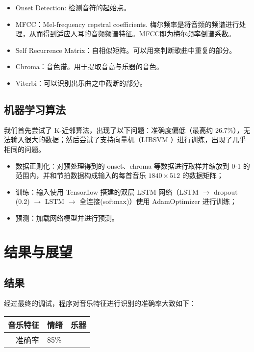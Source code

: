 \documentclass[a4paper,utf8,10pt]{article}
\newcommand{\sept}{\setlength\itemsep{-4pt}}
\begin{document}
\noindent\begin{itemize}
  \sept
  \item Onset Detection: 检测音符的起始点。
  \item MFCC：Mel-frequency cepstral coefficients. 梅尔频率是将音频的频谱进行处理，从而得到适应人耳的音频频谱特征。MFCC即为梅尔频率倒谱系数。
  \item Self Recurrence Matrix：自相似矩阵。可以用来判断歌曲中重复的部分。
  \item Chroma：音色谱。用于提取音高与乐器的音色。
  \item Viterbi：可以识别出乐曲之中截断的部分。
\end{itemize}

\subsection{机器学习算法}

我们首先尝试了 K-近邻算法，出现了以下问题：准确度偏低（最高约 26.7\%），无法输入很大的数据；然后尝试了支持向量机（LIBSVM \cite{CC01a}）进行训练，出现了几乎相同的问题。

\noindent\begin{itemize}
  \sept
  \item 数据正则化：对预处理得到的 onset、chroma 等数据进行取样并缩放到 0-1 的范围内，并和节拍数据构成输入的每首音乐 $1840\times 512$ 的数据矩阵；
  \item 训练：输入使用 Tensorflow 搭建的双层 LSTM 网络（LSTM $\rightarrow$ dropout (0.2) $\rightarrow$ LSTM $\rightarrow$ 全连接(softmax)）使用 AdamOptimizer 进行训练；
  \item 预测：加载网络模型并进行预测。
\end{itemize}

\section{结果与展望}
\subsection{结果}

经过最终的调试，程序对音乐特征进行识别的准确率大致如下：

\begin{center}
\begin{tabular}{ r | l | l }
\hline
音乐特征 & 情绪 & 乐器 \\ \hline
  准确率 & 85\% &      \\ \hline
\end{tabular}
\end{center}
\end{document}
